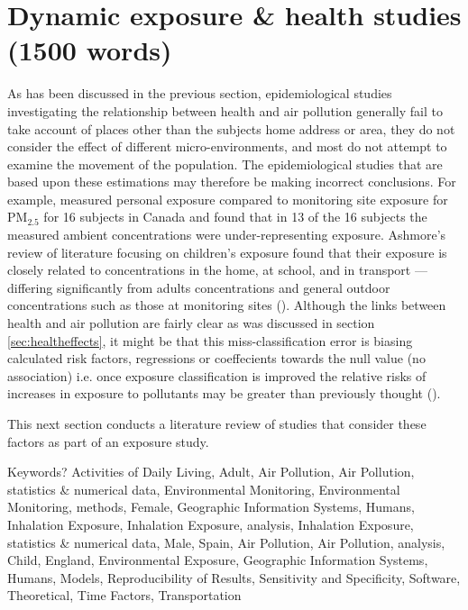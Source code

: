 
\section{Dynamic exposure \& health studies (1500 words)}
\label{sec:dynamicexposurehealth}

As has been discussed in the previous section, epidemiological studies investigating the relationship between health and air pollution generally fail to take account of places other than the subjects home address or area, they do not consider the effect of different micro-environments, and most do not attempt to examine the movement of the population. The epidemiological studies that are based upon these estimations may therefore be making incorrect conclusions. For example, \cite{Brauer2002} measured personal exposure compared to monitoring site exposure for PM$_{2.5}$ for 16 subjects in Canada and found that in 13 of the 16 subjects the measured ambient concentrations were under-representing exposure. Ashmore's review of literature focusing on children's exposure found that their exposure is closely related to concentrations in the home, at school, and in transport --- differing significantly from adults concentrations and general outdoor concentrations such as those at monitoring sites (\cite{Ashmore2009}). Although the links between health and air pollution are fairly clear as was discussed in section \ref{sec:healtheffects}, it might be that this miss-classification error is biasing calculated risk factors, regressions or coeffecients towards the null value (no association) i.e. once exposure classification is improved the relative risks of increases in exposure to pollutants may be greater than previously thought (\cite{Armstrong1990}).

This next section conducts a literature review of studies that consider these factors as part of an exposure study.




Keywords?
Activities of Daily Living, Adult, Air Pollution, Air Pollution, statistics \& numerical data, Environmental Monitoring, Environmental Monitoring, methods, Female, Geographic Information Systems, Humans, Inhalation Exposure, Inhalation Exposure, analysis, Inhalation Exposure, statistics \& numerical data, Male, Spain, Air Pollution, Air Pollution, analysis, Child, England, Environmental Exposure, Geographic Information Systems, Humans, Models, Reproducibility of Results, Sensitivity and Specificity, Software, Theoretical, Time Factors, Transportation

